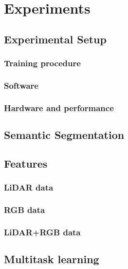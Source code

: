 \chapter{Experiments}%
\label{sec:experiments}


\section{Experimental Setup}%
\label{sec:experimental-setup}
\subsection{Training procedure}

\subsection{Software}

\subsection{Hardware and performance}


\section{Semantic Segmentation}%
\label{sec:specialization-project-summary}


\section{Features}%
\label{sec:features}

\subsection{LiDAR data}

\subsection{RGB data}

\subsection{LiDAR+RGB data}


\section{Multitask learning}\label{sec:multitask-experiments}

